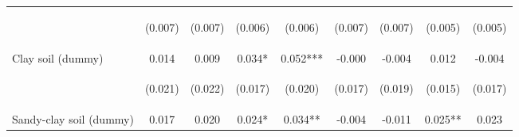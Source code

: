 \begin{center}
\begin{tabular}{lcccccccc}
\vspace{4pt} & \begin{footnotesize}(0.007)\end{footnotesize} & \begin{footnotesize}(0.007)\end{footnotesize} & \begin{footnotesize}(0.006)\end{footnotesize} & \begin{footnotesize}(0.006)\end{footnotesize} & \begin{footnotesize}(0.007)\end{footnotesize} & \begin{footnotesize}(0.007)\end{footnotesize} & \begin{footnotesize}(0.005)\end{footnotesize} & \begin{footnotesize}(0.005)\end{footnotesize} \\
Clay soil (dummy) & 0.014 & 0.009 & 0.034* & 0.052*** & -0.000 & -0.004 & 0.012 & -0.004 \\
\vspace{4pt} & \begin{footnotesize}(0.021)\end{footnotesize} & \begin{footnotesize}(0.022)\end{footnotesize} & \begin{footnotesize}(0.017)\end{footnotesize} & \begin{footnotesize}(0.020)\end{footnotesize} & \begin{footnotesize}(0.017)\end{footnotesize} & \begin{footnotesize}(0.019)\end{footnotesize} & \begin{footnotesize}(0.015)\end{footnotesize} & \begin{footnotesize}(0.017)\end{footnotesize} \\
Sandy-clay soil (dummy) & 0.017 & 0.020 & 0.024* & 0.034** & -0.004 & -0.011 & 0.025** & 0.023 \\

\end{tabular}
\end{center}
